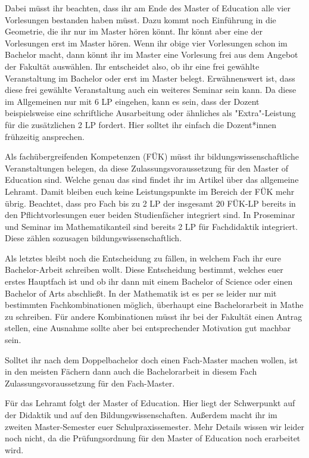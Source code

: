 Dabei müsst ihr beachten, dass ihr am Ende des Master of Education alle vier
Vorlesungen bestanden haben müsst. Dazu kommt noch Einführung in die Geometrie,
die ihr nur im Master hören könnt. Ihr könnt aber eine der Vorlesungen erst im
Master hören. Wenn ihr obige vier Vorlesungen schon im Bachelor macht, dann
könnt ihr im Master eine Vorlesung frei aus dem Angebot der Fakultät auswählen.
Ihr entscheidet also, ob ihr eine frei gewählte Veranstaltung im Bachelor oder
erst im Master belegt.  Erwähnenswert ist, dass diese frei gewählte
Veranstaltung auch ein weiteres Seminar sein kann. Da diese im Allgemeinen nur
mit 6 LP eingehen, kann es sein, dass der Dozent beispielsweise eine
schriftliche Ausarbeitung oder ähnliches als "Extra"-Leistung für die
zusätzlichen 2 LP fordert. Hier solltet ihr einfach die Dozent*innen frühzeitig
ansprechen.

Als fachübergreifenden Kompetenzen (FÜK) müsst ihr bildungswissenschaftliche
Veranstaltungen belegen, da diese Zulassungsvoraussetzung für den Master of
Education sind. Welche genau das sind findet ihr im Artikel über das allgemeine
Lehramt. Damit bleiben euch keine Leistungspunkte im Bereich der FÜK mehr übrig.
Beachtet, dass pro Fach bis zu 2 LP der insgesamt 20 FÜK-LP bereits in den
Pflichtvorlesungen euer beiden Studienfächer integriert sind. In Proseminar und
Seminar im Mathematikanteil sind bereits 2 LP für Fachdidaktik integriert.
Diese zählen sozusagen bildungswissenschaftlich.

Als letztes bleibt noch die Entscheidung zu fällen, in welchem Fach ihr eure
Bachelor-Arbeit schreiben wollt. Diese Entscheidung bestimmt, welches euer
erstes Hauptfach ist und ob ihr dann mit einem Bachelor of Science oder einen
Bachelor of Arts abschließt.
In der Mathematik ist es per se leider nur mit bestimmten Fachkombinationen
möglich, überhaupt eine Bachelorarbeit in Mathe zu schreiben.  Für andere
Kombinationen müsst ihr bei der Fakultät einen Antrag stellen, eine Ausnahme
sollte aber bei entsprechender Motivation gut machbar sein.

Solltet ihr nach dem Doppelbachelor doch einen Fach-Master machen wollen, ist in
den meisten Fächern dann auch die Bachelorarbeit in diesem Fach
Zulassungsvoraussetzung für den Fach-Master.

Für das Lehramt folgt der Master of Education. Hier liegt der Schwerpunkt auf
der Didaktik und auf den Bildungswissenschaften. Außerdem macht ihr im zweiten
Master-Semester euer Schulpraxissemester. Mehr Details wissen wir leider noch
nicht, da die Prüfungsordnung für den Master of Education noch erarbeitet wird.
